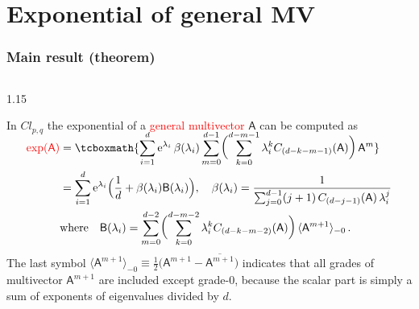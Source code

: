 \documentclass[xcolor=table,hyperref={pdfpagemode=FullScreen}]{beamer}
\newcommand{\ee}{\mathrm{e}} %
\newcommand{\cl}[2]{\ensuremath{\mathit{Cl}_{#1,#2}}} %
\def\m#1{\mathsf{#1}} %
\def\m#1{\mathsf{#1}}%
\newcommand{\red}[1]{\textcolor{red}{#1}}
\begin{document}
\section[Exponential of MV;]{Exponential of general MV}
\begin{frame}
\frametitle<presentation>{Main result (theorem)}
\vskip -19pt
\begin{columns}[t]
\begin{column}{1.15\textwidth}
\begin{theorem}
  In $\cl{p}{q}$ the exponential of a \red{general multivector} $\m{A}$ can be computed as
  \begin{align}&\notag\\[-25pt]
\mkern-0mu \red{\exp(\m{A})}
  &=\tcboxmath{\sum_{i=1}^{d} \ee^{\lambda_i}\,\beta(\lambda_i)
    \sum_{m=0}^{d-1} \biggl(\sum_{k=0}^{d-m-1}\lambda_i^k C_{(d-k-m-1)}(\m{A})\biggr)\, \m{A}^{m}}\label{expNcomplexCoordFree}
  \\
  &= \sum_{i=1}^{d} \ee^{\lambda_i}\Bigl(\frac{1}{d}+\beta(\lambda_i)\m{B}(\lambda_i)\Bigr),\quad
  \beta(\lambda_i)={ \frac{1}{\sum_{j=0}^{d-1}(j+1)\,C_{(d -j-1)}(\m{A})\, \lambda_i^{j}}}\notag \\
  &\mathrm{where}\quad\m{B}(\lambda_i)=  \sum_{m=0}^{d-2} \biggl(\sum_{k=0}^{d-m-2}\lambda_i^k C_{(d-k-m-2)}(\m{A})\biggr)\, \langle\m{A}^{m+1}\rangle_{-0}\,. \notag 
\end{align}
The last symbol
$\langle\m{A}^{m+1}\rangle_{-0}\equiv\frac{1}{2}\bigl(\m{A}^{m+1}-\overline{\m{A}^{m+1}}\bigr)$
indicates that all grades of multivector $\m{A}^{m+1}$ are
included except grade-$0$,
  because
the scalar part is simply a sum of exponents of eigenvalues divided by $d$.
\end{theorem}
\end{column}
\end{columns}
\end{frame}
\end{document}
